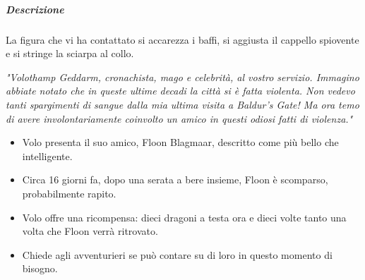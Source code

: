 \documentclass{article}
\begin{document}
                        \subparagraph{Descrizione} La figura che vi ha contattato si accarezza i baffi, si aggiusta il cappello spiovente e si stringe la sciarpa al collo.

                        \textit{"Volothamp Geddarm, cronachista, mago e celebrità, al vostro servizio. Immagino abbiate notato che in queste ultime decadi la città si è fatta violenta. Non vedevo tanti spargimenti di sangue dalla mia ultima visita a Baldur's Gate! Ma ora temo di avere involontariamente coinvolto un amico in questi odiosi fatti di violenza."}
                        
                        \begin{itemize}
                            \item Volo presenta il suo amico, Floon Blagmaar, descritto come più bello che intelligente.
                            \item Circa 16 giorni fa, dopo una serata a bere insieme, Floon è scomparso, probabilmente rapito.
                            \item Volo offre una ricompensa: dieci dragoni a testa ora e dieci volte tanto una volta che Floon verrà ritrovato.
                            \item Chiede agli avventurieri se può contare su di loro in questo momento di bisogno.
                        \end{itemize}
                        
\end{document}
